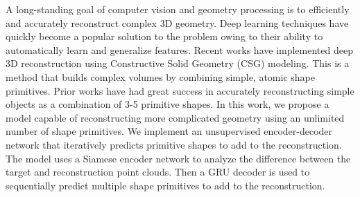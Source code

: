 A long-standing goal of computer vision and geometry processing is to efficiently and accurately reconstruct complex 3D geometry. Deep learning techniques have quickly become a popular solution to the problem owing to their ability to automatically learn and generalize features. Recent works have implemented deep 3D reconstruction using Constructive Solid Geometry (CSG) modeling. This is a method that builds complex volumes by combining simple, atomic shape primitives. Prior works have had great success in accurately reconstructing simple objects as a combination of 3-5 primitive shapes. In this work, we propose a model capable of reconstructing more complicated geometry using an unlimited number of shape primitives. We implement an unsupervised encoder-decoder network that iteratively predicts primitive shapes to add to the reconstruction. The model uses a Siamese encoder network to analyze the difference between the target and reconstruction point clouds. Then a GRU decoder is used to sequentially predict multiple shape primitives to add to the reconstruction.

\vspace{1em}

